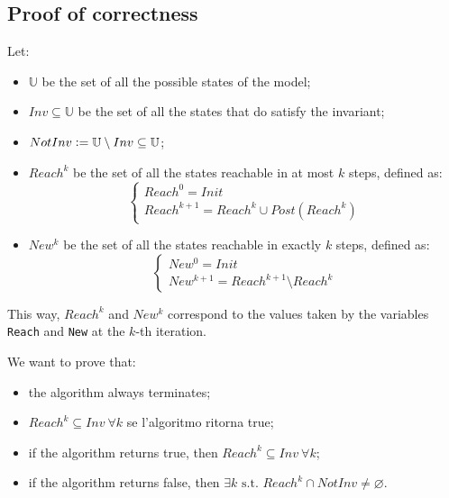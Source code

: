 \documentclass[12pt]{article}
\begin{document}
    \subsection{Proof of correctness}
    Let:
    \begin{itemize}
        \item $\mathbb U$ be the set of all the possible states of the model;
        \item $Inv \subseteq \mathbb U$ be the set of all the states that do satisfy the invariant;
        \item $NotInv \vcentcolon= \mathbb U \setminus Inv \subseteq \mathbb U$;
        \item $Reach^k$ be the set of all the states reachable in at most $k$ steps, defined as:
        $$
            \begin{cases}
                Reach^0 = Init \\
                Reach^{k + 1} = Reach^k \cup Post(Reach^k)
            \end{cases}
        $$
        \item $New^k$ be the set of all the states reachable in exactly $k$ steps, defined as:
        $$
            \begin{cases}
                New^0 = Init \\
                New^{k + 1} = Reach^{k+1} \setminus Reach^k
            \end{cases}
        $$
    \end{itemize}
    This way, $Reach^k$ and $New^k$ correspond to the values taken by the variables \texttt{Reach} and \texttt{New} at the $k$-th iteration.

    We want to prove that:
    \begin{itemize}
        \item the algorithm always terminates;
        \item $Reach^k \subseteq Inv\ \forall k$ se l'algoritmo ritorna true;
        \item if the algorithm returns true, then $Reach^k \subseteq Inv\ \forall k$;
        \item if the algorithm returns false, then $\exists k \mbox{ s.t. } Reach^k \cap NotInv \neq \varnothing$.
    \end{itemize}

\end{document}

